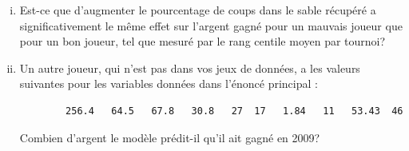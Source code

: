 \documentclass[letter, 11pt]{article}
\begin{document}
\begin{enumerate}[(a)]
\begin{enumerate}[(i)]
    	\item Est-ce que d'augmenter le pourcentage de coups dans le sable récupéré a significativement le même effet sur l'argent gagné pour un mauvais joueur que pour un bon joueur, tel que mesuré par le rang centile moyen par tournoi?
    	\item Un autre joueur, qui n'est pas dans vos jeux de données, a les valeurs suivantes pour les variables données dans l'énoncé principal : 
    	\begin{verbatim} 
    	256.4   64.5   67.8   30.8   27  17   1.84   11   53.43  46 
    	\end{verbatim}
    	Combien d'argent le modèle prédit-il qu'il ait gagné en 2009? \\
    \end{enumerate}
    

\end{enumerate}


\end{document}
